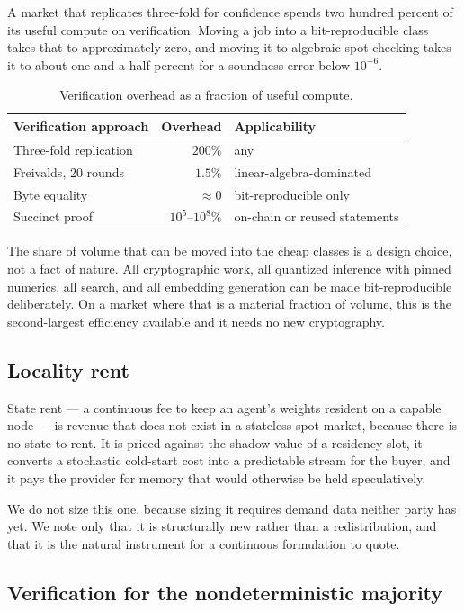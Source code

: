 \documentclass[11pt,a4paper]{article}
\begin{document}
A market that replicates three-fold for confidence spends two hundred percent of
its useful compute on verification. Moving a job into a bit-reproducible class
takes that to approximately zero, and moving it to algebraic spot-checking takes
it to about one and a half percent for a soundness error below $10^{-6}$.

\begin{table}[h]
\centering
\begin{tabular}{lrl}
\toprule
Verification approach & Overhead & Applicability \\
\midrule
Three-fold replication & $200\%$ & any \\
Freivalds, 20 rounds & $1.5\%$ & linear-algebra-dominated \\
Byte equality & $\approx 0$ & bit-reproducible only \\
Succinct proof & $10^{5}$--$10^{8}\%$ & on-chain or reused statements \\
\bottomrule
\end{tabular}
\caption{Verification overhead as a fraction of useful compute.}
\end{table}

The share of volume that can be moved into the cheap classes is a design choice,
not a fact of nature. All cryptographic work, all quantized inference with pinned
numerics, all search, and all embedding generation can be made bit-reproducible
deliberately. On a market where that is a material fraction of volume, this is
the second-largest efficiency available and it needs no new cryptography.

\subsection{Locality rent}

State rent --- a continuous fee to keep an agent's weights resident on a capable
node --- is revenue that does not exist in a stateless spot market, because there
is no state to rent. It is priced against the shadow value of a residency slot,
it converts a stochastic cold-start cost into a predictable stream for the buyer,
and it pays the provider for memory that would otherwise be held speculatively.

We do not size this one, because sizing it requires demand data neither party has
yet. We note only that it is structurally new rather than a redistribution, and
that it is the natural instrument for a continuous formulation to quote.

\subsection{Verification for the nondeterministic majority}
\end{document}
